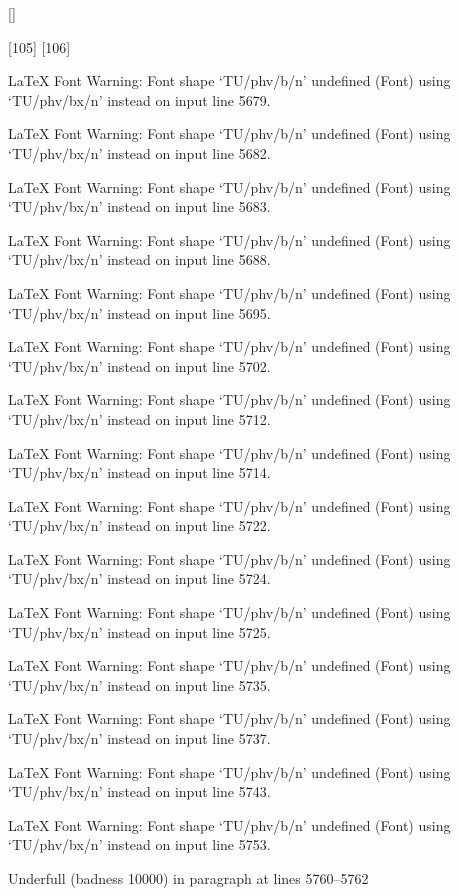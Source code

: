  []

[105] [106]

LaTeX Font Warning: Font shape `TU/phv/b/n' undefined
(Font)              using `TU/phv/bx/n' instead on input line 5679.


LaTeX Font Warning: Font shape `TU/phv/b/n' undefined
(Font)              using `TU/phv/bx/n' instead on input line 5682.


LaTeX Font Warning: Font shape `TU/phv/b/n' undefined
(Font)              using `TU/phv/bx/n' instead on input line 5683.


LaTeX Font Warning: Font shape `TU/phv/b/n' undefined
(Font)              using `TU/phv/bx/n' instead on input line 5688.


LaTeX Font Warning: Font shape `TU/phv/b/n' undefined
(Font)              using `TU/phv/bx/n' instead on input line 5695.


LaTeX Font Warning: Font shape `TU/phv/b/n' undefined
(Font)              using `TU/phv/bx/n' instead on input line 5702.


LaTeX Font Warning: Font shape `TU/phv/b/n' undefined
(Font)              using `TU/phv/bx/n' instead on input line 5712.


LaTeX Font Warning: Font shape `TU/phv/b/n' undefined
(Font)              using `TU/phv/bx/n' instead on input line 5714.


LaTeX Font Warning: Font shape `TU/phv/b/n' undefined
(Font)              using `TU/phv/bx/n' instead on input line 5722.


LaTeX Font Warning: Font shape `TU/phv/b/n' undefined
(Font)              using `TU/phv/bx/n' instead on input line 5724.


LaTeX Font Warning: Font shape `TU/phv/b/n' undefined
(Font)              using `TU/phv/bx/n' instead on input line 5725.


LaTeX Font Warning: Font shape `TU/phv/b/n' undefined
(Font)              using `TU/phv/bx/n' instead on input line 5735.


LaTeX Font Warning: Font shape `TU/phv/b/n' undefined
(Font)              using `TU/phv/bx/n' instead on input line 5737.


LaTeX Font Warning: Font shape `TU/phv/b/n' undefined
(Font)              using `TU/phv/bx/n' instead on input line 5743.


LaTeX Font Warning: Font shape `TU/phv/b/n' undefined
(Font)              using `TU/phv/bx/n' instead on input line 5753.


Underfull \hbox (badness 10000) in paragraph at lines 5760--5762

